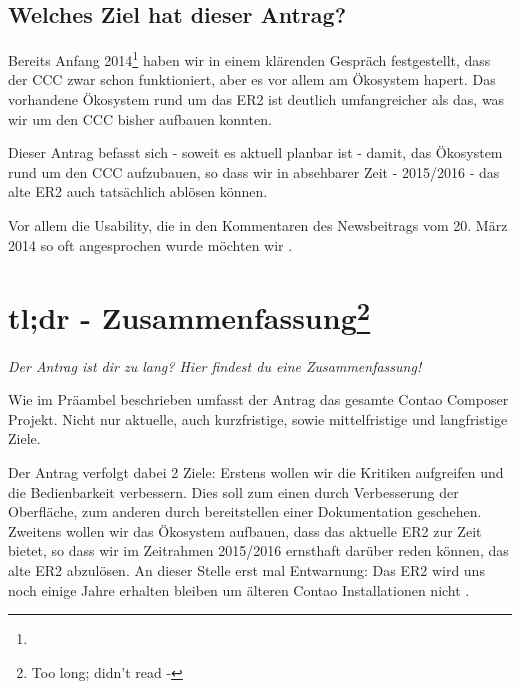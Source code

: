 \documentclass[
paper=a4,
draft=false,%
fontsize=10pt%
]{scrartcl}
\begin{document}
\subsection*{Welches Ziel hat dieser Antrag?}

Bereits Anfang 2014\footnote{} haben wir in einem klärenden Gespräch festgestellt, dass der CCC zwar schon funktioniert, aber es vor allem am Ökosystem hapert. Das vorhandene Ökosystem rund um das ER2 ist deutlich umfangreicher als das, was wir um den CCC bisher aufbauen konnten.

Dieser Antrag befasst sich - soweit es aktuell planbar ist - damit, das Ökosystem rund um den CCC aufzubauen, so dass wir in absehbarer Zeit - 2015/2016 - das alte ER2 auch tatsächlich ablösen können.

Vor allem die  Usability, die in den Kommentaren des Newsbeitrags vom 20. März 2014 so oft angesprochen wurde möchten wir .

\pagebreak
\tableofcontents
\pagebreak

%
%

\section[tl;dr - Zusammenfassung]{tl;dr - Zusammenfassung\footnote{Too long; didn't read -
}}
\label{sec:summary}

\textit{Der Antrag ist dir zu lang? Hier findest du eine Zusammenfassung!}

Wie im Präambel beschrieben umfasst der Antrag das gesamte Contao Composer Projekt. Nicht nur aktuelle, auch kurzfristige, sowie mittelfristige und langfristige Ziele.

Der Antrag verfolgt dabei 2 Ziele:
Erstens wollen wir die Kritiken aufgreifen und die Bedienbarkeit verbessern. Dies soll zum einen durch Verbesserung der Oberfläche, zum anderen durch bereitstellen einer Dokumentation geschehen.
Zweitens wollen wir das Ökosystem aufbauen, dass das aktuelle ER2 zur Zeit bietet, so dass wir im Zeitrahmen 2015/2016 ernsthaft darüber reden können, das alte ER2 abzulösen. An dieser Stelle erst mal Entwarnung: Das ER2 wird uns noch einige Jahre erhalten bleiben um älteren Contao Installationen nicht .
\end{document}
